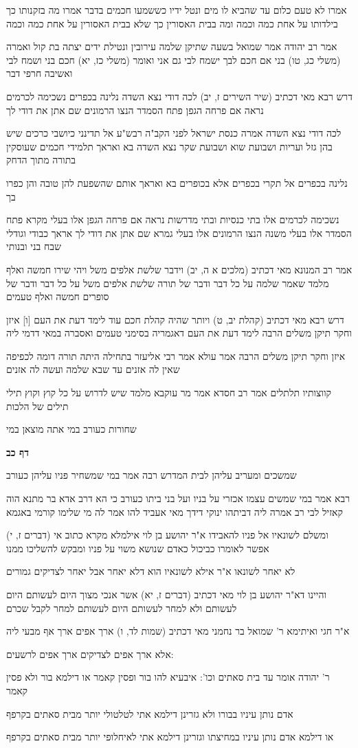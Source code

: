 \documentclass[12pt, openany]{book}
\newcommand{\sethebfont}{
\fontsize{10.5pt}{21.0pt} \selectfont
}
\newcommand{\textblock}[1]{
{\sethebfont #1\\}	
}
\newcommand{\sectname}{}
\newcommand{\newsection}[1]{
	\addcontentsline{toc}{section}{#1}
	\renewcommand{\sectname}{#1}	
	\vspace{-\baselineskip}
	\begin{center}
		\textbf{%
\fontsize{16pt}{16pt}\selectfont
			#1}
	\end{center}
	\vspace{-\baselineskip}
	\nopagebreak
}
\begin{document}
\textblock{אמרו לא טעם כלום עד שהביא לו מים ונטל ידיו כששמעו חכמים בדבר אמרו מה בזקנותו כך בילדותו על אחת כמה וכמה ומה בבית האסורין כך שלא בבית האסורין על אחת כמה וכמה}
\textblock{אמר רב יהודה אמר שמואל בשעה שתיקן שלמה עירובין ונטילת ידים יצתה בת קול ואמרה (משלי כג, טו) בני אם חכם לבך ישמח לבי גם אני ואומר (משלי כז, יא) חכם בני ושמח לבי ואשיבה חרפי דבר}
\textblock{דרש רבא מאי דכתיב (שיר השירים ז, יב) לכה דודי נצא השדה נלינה בכפרים נשכימה לכרמים נראה אם פרחה הגפן פתח הסמדר הנצו הרמונים שם אתן את דודי לך}
\textblock{לכה דודי נצא השדה אמרה כנסת ישראל לפני הקב"ה רבש"ע אל תדינני כיושבי כרכים שיש בהן גזל ועריות ושבועת שוא ושבועת שקר נצא השדה בא ואראך תלמידי חכמים שעוסקין בתורה מתוך הדחק}
\textblock{נלינה בכפרים אל תקרי בכפרים אלא בכופרים בא ואראך אותם שהשפעת להן טובה והן כפרו בך}
\textblock{נשכימה לכרמים אלו בתי כנסיות ובתי מדרשות נראה אם פרחה הגפן אלו בעלי מקרא פתח הסמדר אלו בעלי משנה הנצו הרמונים אלו בעלי גמרא שם אתן את דודי לך אראך כבודי וגודלי שבח בני ובנותי}
\textblock{אמר רב המנונא מאי דכתיב (מלכים א ה, יב) וידבר שלשת אלפים משל ויהי שירו חמשה ואלף מלמד שאמר שלמה על כל דבר ודבר של תורה שלשת אלפים משל על כל דבר ודבר של סופרים חמשה ואלף טעמים}
\textblock{דרש רבא מאי דכתיב (קהלת יב, ט) ויותר שהיה קהלת חכם עוד לימד דעת את העם [ו] איזן וחקר תיקן משלים הרבה לימד דעת את העם דאגמריה בסימני טעמים ואסברה במאי דדמי ליה}
\textblock{[ו] איזן וחקר תיקן משלים הרבה אמר עולא אמר רבי אליעזר בתחילה היתה תורה דומה לכפיפה שאין לה אזנים עד שבא שלמה ועשה לה אזנים}
\textblock{קווצותיו תלתלים אמר רב חסדא אמר מר עוקבא מלמד שיש לדרוש על כל קוץ וקוץ תילי תילים של הלכות}
\textblock{שחורות כעורב במי אתה מוצאן במי}
\newsection{דף כב}
\textblock{שמשכים ומעריב עליהן לבית המדרש רבה אמר במי שמשחיר פניו עליהן כעורב}
\textblock{רבא אמר במי שמשים עצמו אכזרי על בניו ועל בני ביתו כעורב כי הא דרב אדא בר מתנא הוה קאזיל לבי רב אמרה ליה דביתהו ינוקי דידך מאי אעביד להו אמר לה מי שלימו קורמי באגמא}
\textblock{(דברים ז, י) ומשלם לשונאיו אל פניו להאבידו א"ר יהושע בן לוי אילמלא מקרא כתוב אי אפשר לאומרו כביכול כאדם שנושא משוי על פניו ומבקש להשליכו ממנו}
\textblock{לא יאחר לשונאו א"ר אילא לשונאיו הוא דלא יאחר אבל יאחר לצדיקים גמורים}
\textblock{והיינו דא"ר יהושע בן לוי מאי דכתיב (דברים ז, יא) אשר אנכי מצוך היום לעשותם היום לעשותם ולא למחר לעשותם היום לעשותם למחר לקבל שכרם}
\textblock{א"ר חגי ואיתימא ר' שמואל בר נחמני מאי דכתיב (שמות לד, ו) ארך אפים ארך אף מבעי ליה}
\textblock{אלא ארך אפים לצדיקים ארך אפים לרשעים:}
\textblock{ר' יהודה אומר עד בית סאתים וכו': איבעיא להו בור ופסין קאמר או דילמא בור ולא פסין קאמר}
\textblock{אדם נותן עיניו בבורו ולא גזרינן דילמא אתי לטלטולי יותר מבית סאתים בקרפף}
\textblock{או דילמא אדם נותן עיניו במחיצתו וגזרינן דילמא אתי לאיחלופי יותר מבית סאתים בקרפף}
\end{document}
